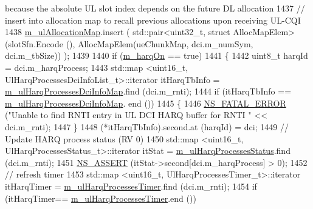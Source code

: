 \begin{DoxyCode}
{       because the absolute UL slot index depends on the future DL allocation}
1437                         \textcolor{comment}{// insert into allocation map to recall previous allocations upon receiving UL-CQI}
1438                         \hyperlink{classns3_1_1MmWaveFlexTtiMaxRateMacScheduler_af147a6545a940d5bd3394db2054582ab}{m\_ulAllocationMap}.insert ( std::pair<uint32\_t, struct
       AllocMapElem> (slotSfn.Encode (), AllocMapElem(ueChunkMap, dci.m\_numSym, dci.m\_tbSize)) );
1439 
1440                         \textcolor{keywordflow}{if} (\hyperlink{classns3_1_1MmWaveFlexTtiMaxRateMacScheduler_a43dee0cca8dce652c2a2dc750262708e}{m\_harqOn} == \textcolor{keyword}{true})
1441                         \{
1442                                 uint8\_t harqId = dci.m\_harqProcess;
1443                                 std::map <uint16\_t, UlHarqProcessesDciInfoList\_t>::iterator itHarqTbInfo = 
      \hyperlink{classns3_1_1MmWaveFlexTtiMaxRateMacScheduler_a5ae563578daa0d3ea769017d73218ec3}{m\_ulHarqProcessesDciInfoMap}.find (dci.m\_rnti);
1444                                 \textcolor{keywordflow}{if} (itHarqTbInfo == \hyperlink{classns3_1_1MmWaveFlexTtiMaxRateMacScheduler_a5ae563578daa0d3ea769017d73218ec3}{m\_ulHarqProcessesDciInfoMap}.
      end ())
1445                                 \{
1446                                         \hyperlink{group__fatal_ga5131d5e3f75d7d4cbfd706ac456fdc85}{NS\_FATAL\_ERROR} (\textcolor{stringliteral}{"Unable to find RNTI entry in UL DCI
       HARQ buffer for RNTI "} << dci.m\_rnti);
1447                                 \}
1448                                 (*itHarqTbInfo).second.at (harqId) = dci;
1449                                 \textcolor{comment}{// Update HARQ process status (RV 0)}
1450                                 std::map <uint16\_t, UlHarqProcessesStatus\_t>::iterator itStat = 
      \hyperlink{classns3_1_1MmWaveFlexTtiMaxRateMacScheduler_a4c1a909f08f91a4c845df5310c35f9ff}{m\_ulHarqProcessesStatus}.find (dci.m\_rnti);
1451                                 \hyperlink{assert_8h_a6dccdb0de9b252f60088ce281c49d052}{NS\_ASSERT} (itStat->second[dci.m\_harqProcess] > 0);
1452                                 \textcolor{comment}{// refresh timer}
1453                                 std::map <uint16\_t, UlHarqProcessesTimer\_t>::iterator itHarqTimer =  
      \hyperlink{classns3_1_1MmWaveFlexTtiMaxRateMacScheduler_af949cb8c0c34fd1e7464931c7138193a}{m\_ulHarqProcessesTimer}.find (dci.m\_rnti);
1454                                 \textcolor{keywordflow}{if} (itHarqTimer== \hyperlink{classns3_1_1MmWaveFlexTtiMaxRateMacScheduler_af949cb8c0c34fd1e7464931c7138193a}{m\_ulHarqProcessesTimer}.end ())

\end{DoxyCode}
